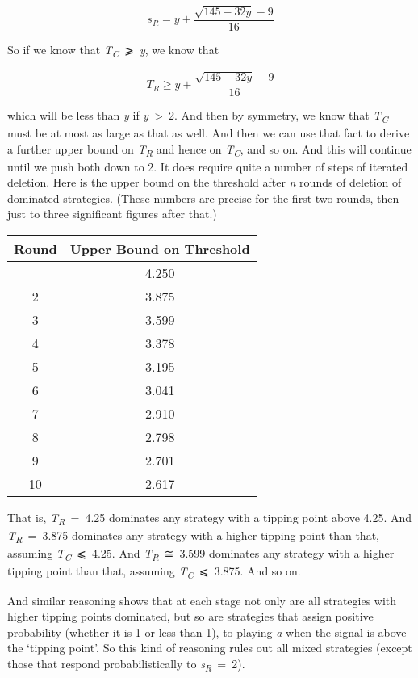 \documentclass[
  11pt,
  letterpaper,
  DIV=11,
  numbers=noendperiod,
  twoside]{scrartcl}
\begin{document}
\[ 
s_R = y + \frac{\sqrt{145-32y} - 9}{16}
\]

So if we know that \emph{T\textsubscript{C}}~⩾~\emph{y}, we know that

\[
T_R \geqslant y + \frac{\sqrt{145-32y} - 9}{16}
\]

which will be less than \emph{y} if \emph{y}~\textgreater~2. And then by
symmetry, we know that \emph{T\textsubscript{C}} must be at most as
large as that as well. And then we can use that fact to derive a further
upper bound on \emph{T\textsubscript{R}} and hence on
\emph{T\textsubscript{C}}, and so on. And this will continue until we
push both down to 2. It does require quite a number of steps of iterated
deletion. Here is the upper bound on the threshold after \emph{n} rounds
of deletion of dominated strategies. (These numbers are precise for the
first two rounds, then just to three significant figures after that.)

\begin{longtable}[]{@{}cc@{}}
\toprule\noalign{}
Round & Upper Bound on Threshold \\
\midrule\noalign{}
\endhead
\bottomrule\noalign{}
\endlastfoot
1 & 4.250 \\
2 & 3.875 \\
3 & 3.599 \\
4 & 3.378 \\
5 & 3.195 \\
6 & 3.041 \\
7 & 2.910 \\
8 & 2.798 \\
9 & 2.701 \\
10 & 2.617 \\
\end{longtable}

That is, \emph{T\textsubscript{R}}~=~4.25 dominates any strategy with a
tipping point above 4.25. And \emph{T\textsubscript{R}}~=~3.875
dominates any strategy with a higher tipping point than that, assuming
\emph{T\textsubscript{C}}~⩽~4.25. And \emph{T\textsubscript{R}}~≅~3.599
dominates any strategy with a higher tipping point than that, assuming
\emph{T\textsubscript{C}}~⩽~3.875. And so on.

And similar reasoning shows that at each stage not only are all
strategies with higher tipping points dominated, but so are strategies
that assign positive probability (whether it is 1 or less than 1), to
playing \emph{a} when the signal is above the `tipping point'. So this
kind of reasoning rules out all mixed strategies (except those that
respond probabilistically to \emph{s\textsubscript{R}}~=~2).
\end{document}
